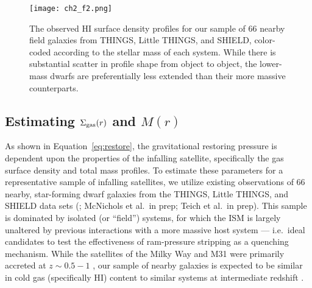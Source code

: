 \begin{figure}
 \centering
 \hspace*{-0.15in}
 \texttt{[image: ch2\_f2.png]}
 \caption{The observed H{\scriptsize I} surface density profiles for
   our sample of $66$ nearby field galaxies from THINGS, Little
   THINGS, and SHIELD, color-coded according to the stellar mass of
   each system. While there is substantial scatter in profile shape
   from object to object, the lower-mass dwarfs are preferentially
   less extended than their more massive counterparts.}
 \label{fig:h1}
\end{figure}




\subsection{Estimating \boldmath$\Sigma_{\rm gas}(r)$ and \boldmath$M(r)$}
\label{subsec:sigM}

As shown in Equation~\ref{eq:restore}, the gravitational restoring
pressure is dependent upon the properties of the infalling satellite,
specifically the gas surface density and total mass profiles.
%
To estimate these parameters for a representative sample of infalling
satellites, we utilize existing observations of $66$ nearby,
star-forming dwarf galaxies from the THINGS, Little THINGS, and SHIELD
data sets (\citealt{walter08, hunter12, cannon11}; McNichols et al.~in
prep; Teich et al.~in prep). 
%
This sample is dominated by isolated (or ``field'') systems, for which
the ISM is largely unaltered by previous interactions with a more
massive host system --- i.e.~ideal candidates to test the
effectiveness of ram-pressure stripping as a quenching mechanism.
%
While the satellites of the Milky Way and M31 were primarily accreted
at $z \sim 0.5-1$ \citep{wetzel15a, fham15}, our sample of nearby
galaxies is expected to be similar in cold gas (specifically
H{\scriptsize I}) content to similar systems at intermediate redshift
\citep{popping15, somerville15}.
%

